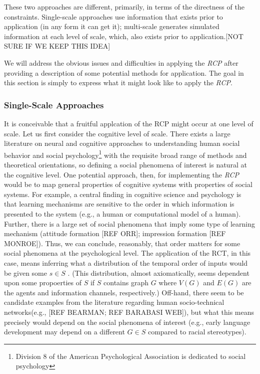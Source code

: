 \documentclass{article}
\begin{document}
These two approaches are different, primarily, in terms of the directness of the constraints.  Single-scale approaches use information that exists prior to application (in any form it can get it); multi-scale generates simulated information at each level of scale, which, also exists prior to application.[NOT SURE IF WE KEEP THIS IDEA] 

We will address the obvious issues and difficulties in applying the \textit{RCP} after providing a description of some potential methods for application.  The goal in this section is simply to express what it might look like to apply the \textit{RCP}.   

\subsubsection{Single-Scale Approaches}
It is conceivable that a fruitful applcation of the RCP might occur at one level of scale.  Let us first consider the cognitive level of scale.  There exists a large literature on neural and cognitive approaches to understanding human social behavior and social psychology\footnote{Division 8 of the American Psychological Association is dedicated to social psychology} with the requisite broad range of methods and theoretical orientations, so defining a social phenomena of interest is natural at the cognitive level. One potential approach, then, for implementing the \textit{RCP} would be to map general properties of cognitive systems with properties of social systems.  For example, a central finding in cognitive science and psychology is that learning mechanisms are sensitive to the order in which information is presented to the system (e.g., a human or computational model of a human).  Further, there is a large set of social phenomena that imply some type of learning mechanism (attitude formation [REF ORR]; impression formation [REF MONROE]).  Thus, we can conclude, reasonably, that order matters for some social phenomena at the psychological level.  The application of the RCT, in this case, means inferring what a distribution of the temporal order of inputs would be given some $s \in S$ . (This distribution, almost axiomatically, seems dependent upon some propoerties of $S$ if $S$ contains graph $G$ where $V(G)$ and $E(G)$ are the agents and information channels, respectively.)  Off-hand, there seem to be candidate examples from the literature regarding human socio-technical networks(e.g., [REF BEARMAN; REF BARABASI WEB]), but what this means precisely would depend on the social phenomena of interest (e.g., early language development may depend on a different $G \in S$ compared to racial stereotypes).  
\end{document}
